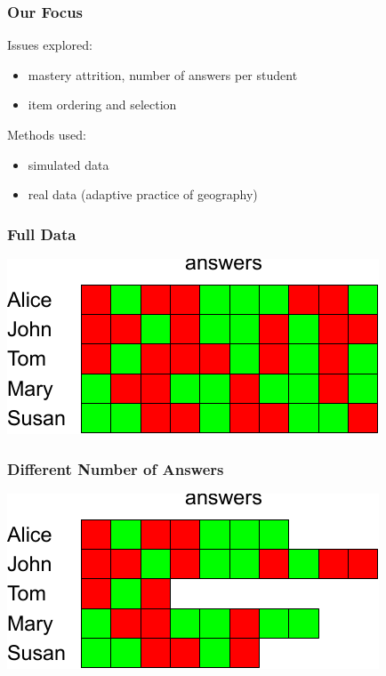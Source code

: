 \documentclass[bigger]{beamer}
\begin{document}
\begin{frame}
  \frametitle{Our Focus}

  Issues explored:
  \begin{itemize}
  \item mastery attrition, number of answers per student
  \item item ordering and selection
  \end{itemize}

  \bigskip

  Methods used:
  \begin{itemize}
  \item simulated data
  \item real data (adaptive practice of geography)
  \end{itemize}
\end{frame}

\begin{frame}
  \frametitle{Full Data}
  \begin{center}
    \includegraphics[width=.8\linewidth]{answers-full}
  \end{center}
\end{frame}

\begin{frame}
  \frametitle{Different Number of Answers}
  \begin{center}
    \includegraphics[width=.8\linewidth]{answers-random}
  \end{center}
\end{frame}
\end{document}
